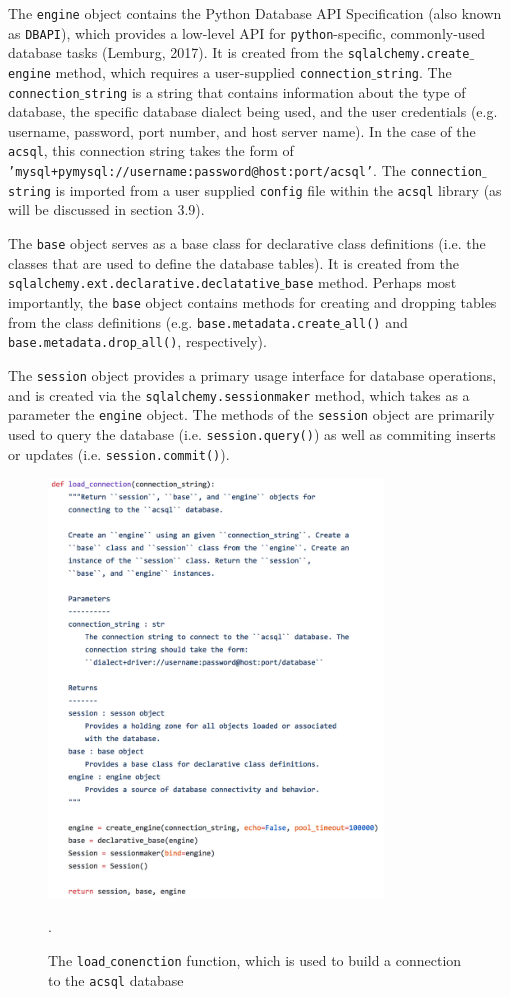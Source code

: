 \documentclass[10pt,journal,compsoc]{IEEEtran}
\begin{document}
The \texttt{engine} object contains the Python Database API Specification (also
known as \texttt{DBAPI}), which provides a low-level API for \texttt{python}-specific, commonly-used
database tasks (Lemburg, 2017).  It is created from the \texttt{sqlalchemy.create$\_$engine} method, which
requires a user-supplied \texttt{connection$\_$string}.  The \texttt{connection$\_$string} is a string
that contains information about the type of database, the specific database dialect being used, and
the user credentials (e.g. username, password, port number, and host server name).  In the case
of the \texttt{acsql}, this connection string takes the form of
\texttt{'mysql+pymysql://username:password@host:port/acsql'}.  The \texttt{connection$\_$string} is
imported from a user supplied \texttt{config} file within the \texttt{acsql} library
(as will be discussed in section 3.9).

The \texttt{base} object serves as a base class for declarative class definitions (i.e. the
classes that are used to define the database tables).  It is created from the
\texttt{sqlalchemy.ext.declarative.declatative$\_$base} method.  Perhaps most importantly, the
\texttt{base} object contains methods for creating and dropping tables from the class
definitions (e.g. \texttt{base.metadata.create$\_$all()} and \texttt{base.metadata.drop$\_$all()},
respectively).

The \texttt{session} object provides a primary usage interface for database operations, and
is created via the \texttt{sqlalchemy.sessionmaker} method, which takes as a parameter the
\texttt{engine} object.  The methods of the \texttt{session} object are primarily used to
query the database (i.e. \texttt{session.query()}) as well as commiting inserts or updates (i.e.
\texttt{session.commit()}).

\begin{figure}[!t]
\centering
\includegraphics[width=3.5in]{./figures/load_connection.png}
\caption{The \texttt{load$\_$conenction} function, which is used to build a connection to the
\texttt{acsql} database}.
\label{fig1}
\end{figure}
\end{document}
